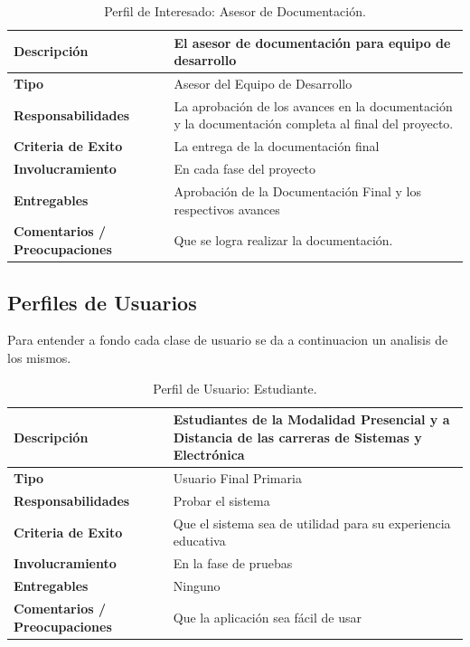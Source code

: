 \pagebreak

\begin{table}[h!]
  \begin{tabular}{|p{}|p{}|}
    \hline
    \textbf{Descripción} & El asesor de documentación para equipo de desarrollo \\
    \hline
    \textbf{Tipo} & Asesor del Equipo de Desarrollo \\
    \hline
    \textbf{Responsabilidades} & La aprobación de los avances en la documentación y la documentación completa al final del proyecto. \\
    \hline
    \textbf{Criteria de Exito} & La entrega de la documentación final \\
    \hline
    \textbf{Involucramiento} & En cada fase del proyecto \\
    \hline
    \textbf{Entregables} & Aprobación de la Documentación Final y los respectivos avances \\
    \hline
    \textbf{Comentarios / Preocupaciones} & Que se logra realizar la documentación. \\
    \hline
  \end{tabular}
  \caption{Perfil de Interesado: Asesor de Documentación.}
  \label{per-inter-a-doc}
\end{table}

\vfill

\subsection{Perfiles de Usuarios}
Para entender a fondo cada clase de usuario se da a continuacion un analisis de los mismos.

\begin{table}[h!]
  \begin{tabular}{|p{}|p{}|}
    \hline
    \textbf{Descripción} & Estudiantes de la Modalidad Presencial y a Distancia de las carreras de Sistemas y Electrónica \\
    \hline
    \textbf{Tipo} & Usuario Final Primaria \\
    \hline
    \textbf{Responsabilidades} & Probar el sistema \\
    \hline
    \textbf{Criteria de Exito} & Que el sistema sea de utilidad para su experiencia educativa \\
    \hline
    \textbf{Involucramiento} & En la fase de pruebas \\
    \hline
    \textbf{Entregables} & Ninguno \\
    \hline
    \textbf{Comentarios / Preocupaciones} & Que la aplicación sea fácil de usar \\
    \hline
  \end{tabular}
  \caption{Perfil de Usuario: Estudiante.}
  \label{per-user-estu}
\end{table}

